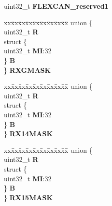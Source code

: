 \begin{DoxyCompactItemize}
\begin{tabbing}
\end{tabbing}\item 
\mbox{\label{structFLEXCAN__tag_a79e168517364cafab32cdbe6bd64cac7}} 
uint32\+\_\+t {\bfseries F\+L\+E\+X\+C\+A\+N\+\_\+reserved1}
\item 
\mbox{\label{structFLEXCAN__tag_a0bda95c82f49080b27c07f5014607770}} 
\begin{tabbing}
xx\=xx\=xx\=xx\=xx\=xx\=xx\=xx\=xx\=\kill
union \{\\
\>uint32\_t {\bfseries R}\\
\>struct \{\\
\>\>uint32\_t {\bfseries MI}:32\\
\>\} {\bfseries B}\\
\} {\bfseries RXGMASK}\\

\end{tabbing}\item 
\mbox{\label{structFLEXCAN__tag_a9728b6cc330c9828d250497f1d22da45}} 
\begin{tabbing}
xx\=xx\=xx\=xx\=xx\=xx\=xx\=xx\=xx\=\kill
union \{\\
\>uint32\_t {\bfseries R}\\
\>struct \{\\
\>\>uint32\_t {\bfseries MI}:32\\
\>\} {\bfseries B}\\
\} {\bfseries RX14MASK}\\

\end{tabbing}\item 
\mbox{\label{structFLEXCAN__tag_a80a4bfd30d144bc45e531e5359bbf896}} 
\begin{tabbing}
xx\=xx\=xx\=xx\=xx\=xx\=xx\=xx\=xx\=\kill
union \{\\
\>uint32\_t {\bfseries R}\\
\>struct \{\\
\>\>uint32\_t {\bfseries MI}:32\\
\>\} {\bfseries B}\\
\} {\bfseries RX15MASK}\\


\end{tabbing}
\end{DoxyCompactItemize}
